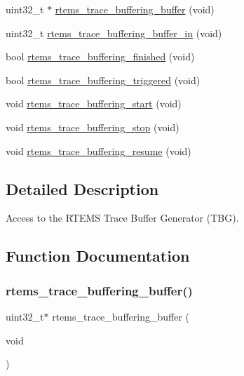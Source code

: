 \begin{DoxyCompactItemize}
\item 
uint32\+\_\+t $\ast$ \mbox{\hyperlink{rtems-trace-buffer-vars_8h_af8c88e7683d47d48676e6255c351302b}{rtems\+\_\+trace\+\_\+buffering\+\_\+buffer}} (void)
\item 
uint32\+\_\+t \mbox{\hyperlink{rtems-trace-buffer-vars_8h_ab35260dfb21f5668279178ead0458858}{rtems\+\_\+trace\+\_\+buffering\+\_\+buffer\+\_\+in}} (void)
\item 
bool \mbox{\hyperlink{rtems-trace-buffer-vars_8h_ae97a06bc8b6860a682f792a35c32e919}{rtems\+\_\+trace\+\_\+buffering\+\_\+finished}} (void)
\item 
bool \mbox{\hyperlink{rtems-trace-buffer-vars_8h_ad56df301de0d2917e1a6ef7b27c5d4c6}{rtems\+\_\+trace\+\_\+buffering\+\_\+triggered}} (void)
\item 
void \mbox{\hyperlink{rtems-trace-buffer-vars_8h_ad107f480c1700a7ca1b25f56d6b3ab68}{rtems\+\_\+trace\+\_\+buffering\+\_\+start}} (void)
\item 
void \mbox{\hyperlink{rtems-trace-buffer-vars_8h_acd01253393a47c67fdd37e3bf1d1d296}{rtems\+\_\+trace\+\_\+buffering\+\_\+stop}} (void)
\item 
void \mbox{\hyperlink{rtems-trace-buffer-vars_8h_adbdd10f5bb1e463734781c282f3128f9}{rtems\+\_\+trace\+\_\+buffering\+\_\+resume}} (void)
\end{DoxyCompactItemize}


\subsection{Detailed Description}
Access to the R\+T\+E\+MS Trace Buffer Generator (T\+BG). 



\subsection{Function Documentation}
\mbox{\label{rtems-trace-buffer-vars_8h_af8c88e7683d47d48676e6255c351302b}} 
\subsubsection{\texorpdfstring{rtems\_trace\_buffering\_buffer()}{rtems\_trace\_buffering\_buffer()}}
{\footnotesize\ttfamily uint32\+\_\+t$\ast$ rtems\+\_\+trace\+\_\+buffering\+\_\+buffer (\begin{DoxyParamCaption}\item[{void}]{ }\end{DoxyParamCaption})}

